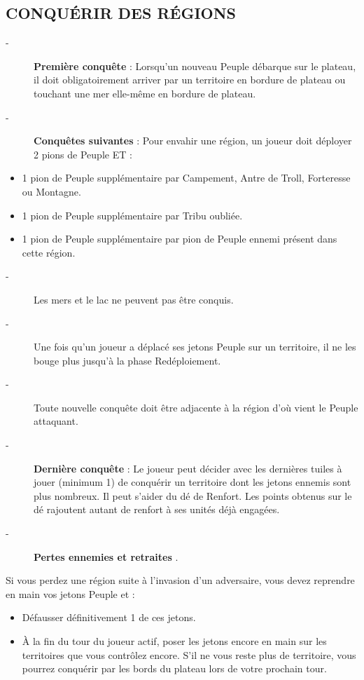 \documentclass{scrartcl}%
\begin{document}
\subsection{ CONQUÉRIR DES RÉGIONS
}%
\label{subsec:CONQURIRDESRGIONS}%
\begin{description}%
\item[{-} ]%
%
\textcolor{mygreen}{%
\textbf{Première conquête}%
}%
\textit{ }%
 : Lorsqu'un nouveau Peuple débarque sur le plateau, il doit obligatoirement arriver par un territoire en bordure de plateau ou touchant une mer elle{-}même en bordure de plateau.
%
\item[{-} ]%
%
\textcolor{mygreen}{%
\textbf{Conquêtes suivantes}%
}%
\textit{ }%
 : Pour envahir une région, un joueur doit déployer 2 pions de Peuple ET :
%
\end{description}%
\begin{itemize}%
\item%
%
 1 pion de Peuple supplémentaire par Campement, Antre de Troll, Forteresse ou Montagne.
%
\item%
%
 1 pion de Peuple supplémentaire par Tribu oubliée.
%
\item%
%
 1 pion de Peuple supplémentaire par pion de Peuple ennemi présent dans cette région.
%
\end{itemize}%
\begin{description}%
\item[{-} ]%
%
 Les mers et le lac ne peuvent pas être conquis.
%
\item[{-} ]%
%
 Une fois qu'un joueur a déplacé ses jetons Peuple sur un territoire, il ne les bouge plus jusqu'à la phase Redéploiement.
%
\item[{-} ]%
%
 Toute nouvelle conquête doit être adjacente à la région d'où vient le Peuple attaquant.
%
\item[{-} ]%
%
\textcolor{mygreen}{%
\textbf{Dernière conquête}%
}%
: Le joueur peut décider avec les dernières tuiles à jouer (minimum 1) de conquérir un territoire dont les jetons ennemis sont plus nombreux. Il peut s'aider du dé de Renfort. Les points obtenus sur le dé rajoutent autant de renfort à ses unités déjà engagées.
%
\item[{-} ]%
%
\textcolor{mygreen}{%
\textbf{Pertes ennemies et retraites}%
}%
.
%
\end{description}%
Si vous perdez une région suite à l'invasion d'un adversaire, vous devez reprendre en main vos jetons Peuple et :
%
\begin{itemize}%
\item%
%
 Défausser définitivement 1 de ces jetons.
%
\item%
%
 À la fin du tour du joueur actif, poser les jetons encore en main sur les territoires que vous contrôlez encore. S'il ne vous reste plus de territoire, vous pourrez conquérir par les bords du plateau lors de votre prochain tour.
%
\end{itemize}%
\end{document}

